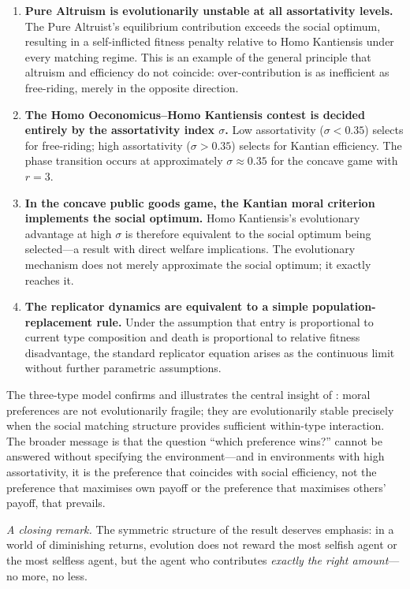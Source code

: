 \documentclass[12pt]{article}
\begin{document}
\begin{enumerate}
    \item \textbf{Pure Altruism is evolutionarily unstable at all assortativity levels.} The Pure Altruist's equilibrium contribution exceeds the social optimum, resulting in a self-inflicted fitness penalty relative to Homo Kantiensis under every matching regime. This is an example of the general principle that altruism and efficiency do not coincide: over-contribution is as inefficient as free-riding, merely in the opposite direction.

    \item \textbf{The Homo Oeconomicus--Homo Kantiensis contest is decided entirely by the assortativity index $\sigma$.} Low assortativity ($\sigma < 0.35$) selects for free-riding; high assortativity ($\sigma > 0.35$) selects for Kantian efficiency. The phase transition occurs at approximately $\sigma \approx 0.35$ for the concave game with $r = 3$.

    \item \textbf{In the concave public goods game, the Kantian moral criterion implements the social optimum.} Homo Kantiensis's evolutionary advantage at high $\sigma$ is therefore equivalent to the social optimum being selected---a result with direct welfare implications. The evolutionary mechanism does not merely approximate the social optimum; it exactly reaches it.

    \item \textbf{The replicator dynamics are equivalent to a simple population-replacement rule.} Under the assumption that entry is proportional to current type composition and death is proportional to relative fitness disadvantage, the standard replicator equation arises as the continuous limit without further parametric assumptions.
\end{enumerate}

The three-type model confirms and illustrates the central insight of \citet{AlgerWeibull2013}: moral preferences are not evolutionarily fragile; they are evolutionarily stable precisely when the social matching structure provides sufficient within-type interaction. The broader message is that the question ``which preference wins?'' cannot be answered without specifying the environment---and in environments with high assortativity, it is the preference that coincides with social efficiency, not the preference that maximises own payoff or the preference that maximises others' payoff, that prevails.

\bigskip
\noindent\textit{A closing remark.} The symmetric structure of the result deserves emphasis: in a world of diminishing returns, evolution does not reward the most selfish agent or the most selfless agent, but the agent who contributes \emph{exactly the right amount}---no more, no less.



\end{document}
